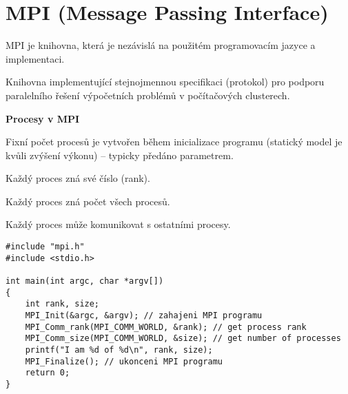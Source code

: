\section{MPI (Message Passing Interface)}

\begin{compactitem}
    \item MPI je knihovna, která je nezávislá na použitém programovacím jazyce a implementaci.

    \item Knihovna implementující stejnojmennou specifikaci (protokol) pro podporu paralelního řešení výpočetních problémů v počítačových clusterech.

    \item \textbf{Procesy v MPI} \begin{compactitem}
        \item Fixní počet procesů je vytvořen během inicializace programu (statický model je kvůli zvýšení výkonu) -- typicky předáno parametrem.
        \item Každý proces zná své číslo (rank).
        \item Každý proces zná počet všech procesů.
        \item Každý proces může komunikovat s ostatními procesy.
    \end{compactitem}

\end{compactitem}

\noindent\begin{minipage}{\linewidth}
    \begin{lstlisting}[language=c_language, caption={Základní příkazy MPI.}]
#include "mpi.h"
#include <stdio.h>

int main(int argc, char *argv[])
{
    int rank, size;
    MPI_Init(&argc, &argv); // zahajeni MPI programu
    MPI_Comm_rank(MPI_COMM_WORLD, &rank); // get process rank
    MPI_Comm_size(MPI_COMM_WORLD, &size); // get number of processes
    printf("I am %d of %d\n", rank, size);
    MPI_Finalize(); // ukonceni MPI programu
    return 0;
}
\end{lstlisting}
\end{minipage}

